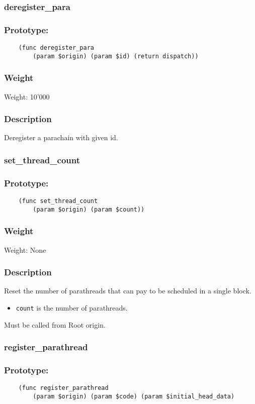\documentclass[11pt,a4paper]{article}
\begin{document}
\subsubsection{deregister\_para}
\subsubsection*{Prototype:}
\begin{verbatim}
    (func deregister_para
        (param $origin) (param $id) (return dispatch))
\end{verbatim}
\subsubsection*{Weight}
Weight: 10'000 
\subsubsection*{Description}
Deregister a parachain with given id.

\subsubsection{set\_thread\_count}
\subsubsection*{Prototype:}
\begin{verbatim}
    (func set_thread_count
        (param $origin) (param $count))
\end{verbatim}
\subsubsection*{Weight}
Weight: None
\subsubsection*{Description}
Reset the number of parathreads that can pay to be scheduled in a single block.
\begin{itemize}
\item \verb|count| is the number of parathreads.
\end{itemize}
Must be called from Root origin.

\subsubsection{register\_parathread}
\subsubsection*{Prototype:}
\begin{verbatim}
    (func register_parathread
        (param $origin) (param $code) (param $initial_head_data)
\end{verbatim}
\end{document}
